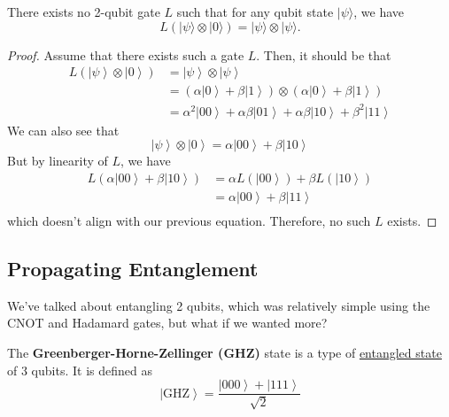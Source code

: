 \documentclass{article}
\newcommand{\ket}[1]{\ensuremath{\left|#1\right\rangle}}
\newcounter{theorem}[section]
\newcounter{definition}[section]
\begin{document}
    \begin{theorem}
      \label{thm:no-cloning-theorem}
      There exists no 2-qubit gate $L$ such that for any qubit state $|\psi \rangle$, we have 
      \begin{equation} 
        L(|\psi \rangle \otimes |0\rangle) = |\psi \rangle \otimes |\psi \rangle. 
      \end{equation}
    \end{theorem}
    \begin{proof} 
      Assume that there exists such a gate $L$. Then, it should be that 
      \begin{align} 
        L(\ket{\psi} \otimes \ket{0}) 
        & = \ket{\psi} \otimes \ket{\psi} \\
        & = (\alpha \ket{0} + \beta \ket{1}) \otimes (\alpha \ket{0} + \beta \ket{1}) \\  
        & = \alpha^2 \ket{00} + \alpha \beta \ket{01} + \alpha \beta \ket{10} + \beta^2 \ket{11}
      \end{align}
      We can also see that 
      \begin{equation} 
        \ket{\psi} \otimes \ket{0} = \alpha \ket{00} + \beta \ket{10}
      \end{equation}
      But by linearity of $L$, we have 
      \begin{align} 
        L(\alpha \ket{00} + \beta \ket{10}) & = \alpha L(\ket{00}) + \beta L(\ket{10}) \\ 
                                            & = \alpha \ket{00} + \beta \ket{11} \\
      \end{align}
      which doesn't align with our previous equation. Therefore, no such $L$ exists. 
    \end{proof}

  \subsection{Propagating Entanglement}

    We've talked about entangling 2 qubits, which was relatively simple using the CNOT and Hadamard gates, but what if we wanted more? 

    \begin{definition}
      \label{def:greenberger-horne-zellinger-ghz-state}
      The \textbf{Greenberger-Horne-Zellinger (GHZ)} state is a type of \hyperref[def:entangled-state]{entangled state} of 3 qubits. It is defined as 
      \begin{equation} 
        \ket{\mathrm{GHZ}} = \frac{\ket{000} + \ket{111}}{\sqrt{2}}
      \end{equation}
    \end{definition}
\end{document}

